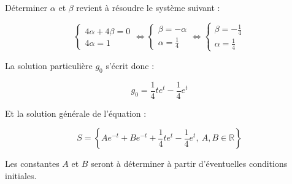 \documentclass[a4paper, 11pt]{report} %
\newcommand{\R}{\mathbb{R}}
\begin{document}
Déterminer $\alpha$ et $\beta$ revient à résoudre le système suivant :

\[
\left\{
\begin{array}{l}
4\alpha + 4\beta = 0\\
4\alpha = 1
\end{array}
\right.
\Leftrightarrow
\left\{
\begin{array}{l}
\beta = -\alpha\\
\alpha = \frac{1}{4}
\end{array}
\right.
\Leftrightarrow
\left\{
\begin{array}{l}
\beta = -\frac{1}{4}\\
\alpha = \frac{1}{4}
\end{array}
\right.
\]

La solution particulière $g_0$ s'écrit donc :

\[ g_0 = \frac{1}{4}te^t - \frac{1}{4}e^t \]

Et la solution générale de l'équation :

\[
S = \left\{Ae^{-t} + Be^{-t} +\frac{1}{4}te^t - \frac{1}{4}e^t,~A,B\in\R\right\}
\]

Les constantes $A$ et $B$ seront à déterminer à partir d'éventuelles conditions initiales.

\end{document}
